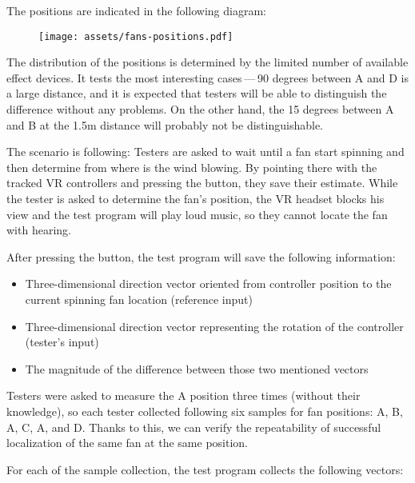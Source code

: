 The positions are indicated in the following diagram:


\begin{figure}[h]{}
\centering\texttt{[image: assets/fans-positions.pdf]}
\caption{}

\end{figure}

The distribution of the positions is determined by the limited number of
available effect devices. It tests the most interesting cases — 90 degrees between A and D is a large distance, and it is expected that testers
will be able to distinguish the difference without any problems.
On the other hand, the 15 degrees between
A and B at the 1.5m distance will probably not be distinguishable.



The scenario is following: Testers are asked to wait until a fan start spinning
and then determine from where is the wind blowing. By pointing there with the
tracked VR controllers and pressing the button, they save their estimate.
While the tester is asked to determine the fan’s position, the VR headset
blocks his view and the test program will play loud music, so they
cannot locate the fan with hearing.


After pressing the button, the test program will save the following information:


\begin{itemize}

\item Three-dimensional direction vector oriented from controller position to
the current spinning fan location (reference input)

\item Three-dimensional direction vector representing the rotation of the
controller (tester’s input)

\item The magnitude of the difference between those two mentioned vectors

\end{itemize}


Testers were asked to measure the A position three times (without their knowledge),
so each tester collected following six samples for fan positions: A, B, A, C,
A, and D. Thanks to this, we can verify the repeatability of successful
localization of the same fan at the same position.


For each of the sample collection, the test program collects the following vectors:


